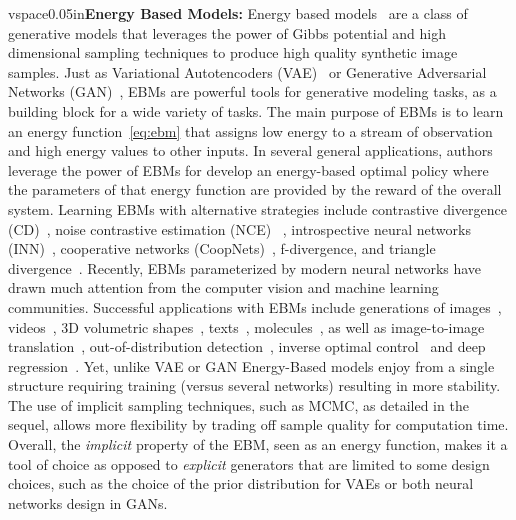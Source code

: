 \documentclass[letterpaper]{article} %
\begin{document}
vspace{0.05in}\noindent\textbf{Energy Based Models: }
Energy based models~\cite{lecun2006tutorial,ngiam2011learning} are a class of generative models that leverages the power of Gibbs potential and high dimensional sampling techniques to produce high quality synthetic image samples.
Just as Variational Autotencoders (VAE)~\cite{kingma2013auto} or Generative Adversarial Networks (GAN)~\cite{goodfellow2014generative}, EBMs are powerful tools for generative modeling tasks, as a building block for a wide variety of tasks. 
The main purpose of EBMs is to learn an energy function~\eqref{eq:ebm} that assigns low energy to a stream of observation and high energy values to other inputs.
In several general applications, authors leverage the power of EBMs for  develop an energy-based optimal policy where the parameters of that energy function are provided by the reward of the overall system.
Learning EBMs with alternative strategies include contrastive divergence (CD)~\cite{hinton2002training,tieleman2008training}, noise contrastive estimation (NCE)~\cite{gutmann2010noise,gao2020flow} , introspective neural networks (INN)~\cite{lazarow2017introspective,jin2017introspective,lee2018wasserstein}, cooperative networks (CoopNets)~\cite{xie2020learning,xie2021cooperative}, f-divergence\cite{yu2020training}, and triangle divergence~\cite{han2019divergence,han2020joint}.
Recently, EBMs parameterized by modern neural networks have drawn much attention from the computer vision and machine learning communities. Successful applications with EBMs include generations of images~\cite{xie2016theory,gao2018learning,du2019implicit}, videos~\cite{XieCVPR17,xie2019learning}, 3D volumetric shapes~\cite{xie2018learning,xie2020generative}, 
texts~\cite{deng2020residual}, molecules~\cite{ingraham2018learning,du2019energy}, as well as image-to-image translation~\cite{xie2021cooperative,xie2021cycleCoopNets}, %
out-of-distribution detection~\cite{ebmood2020}, inverse optimal control~\cite{xu2019energy} and deep regression~\cite{gustafsson2020energy}.
Yet, unlike VAE or GAN Energy-Based models enjoy from a single structure requiring training (versus several networks) resulting in more stability.
The use of implicit sampling techniques, such as MCMC, as detailed in the sequel, allows more flexibility by trading off sample quality for computation time.
Overall, the \emph{implicit} property of the EBM, seen as an energy function, makes it a tool of choice as opposed to \emph{explicit} generators that are limited to some design choices, such as the choice of the prior distribution for VAEs or both neural networks design in GANs.
\end{document}
